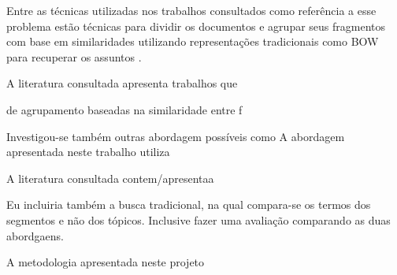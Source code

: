 Entre as técnicas utilizadas nos trabalhos consultados como referência a esse problema estão técnicas para dividir os documentos e agrupar seus fragmentos com base em similaridades utilizando representações tradicionais como BOW para recuperar os assuntos . 

A literatura consultada apresenta trabalhos que 

de agrupamento baseadas na similaridade entre f


Investigou-se também outras abordagem possíveis como 
A abordagem apresentada neste trabalho utiliza 





A literatura consultada contem/apresentaa




















































Eu incluiria também a busca tradicional, na qual compara-se os termos dos segmentos e não dos tópicos. Inclusive fazer uma avaliação comparando as duas abordgaens.





A metodologia apresentada neste projeto 




























